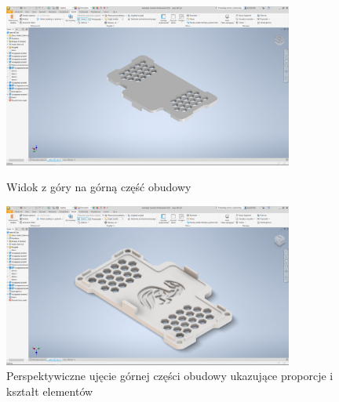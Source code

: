 \begin{figure}[htbp]
\centering
	\includegraphics[width=0.85\textwidth]{root/cover_top.png}
	\caption{Widok z góry na górną część obudowy}
	\vspace{1cm}
	\includegraphics[width=0.85\textwidth]{root/cover_top_alt.png}
	\caption{Perspektywiczne ujęcie górnej części obudowy ukazujące proporcje i kształt elementów}
\end{figure}

